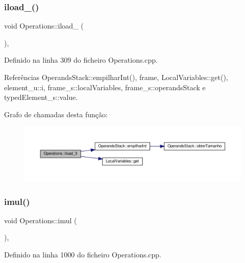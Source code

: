 \subsubsection{\texorpdfstring{iload\+\_()}{iload\_3()}}
{\footnotesize\ttfamily void Operations\+::iload\+\_ (\begin{DoxyParamCaption}{ }\end{DoxyParamCaption})\hspace{0.3cm}{\ttfamily [static]}, {\ttfamily [private]}}



Definido na linha 309 do ficheiro Operations.\+cpp.



Referências Operands\+Stack\+::empilhar\+Int(), frame, Local\+Variables\+::get(), element\+\_\+u\+::i, frame\+\_\+s\+::local\+Variables, frame\+\_\+s\+::operands\+Stack e typed\+Element\+\_\+s\+::value.

Grafo de chamadas desta função\+:
\nopagebreak
\begin{figure}[H]
\begin{center}
\leavevmode
\includegraphics[width=350pt]{classOperations_a3f645534291129289ee71c708dbe633c_cgraph}
\end{center}
\end{figure}
\mbox{\label{classOperations_a01b2ffdd380327b31b03657eb99b8a81}} 
\subsubsection{\texorpdfstring{imul()}{imul()}}
{\footnotesize\ttfamily void Operations\+::imul (\begin{DoxyParamCaption}{ }\end{DoxyParamCaption})\hspace{0.3cm}{\ttfamily [static]}, {\ttfamily [private]}}



Definido na linha 1000 do ficheiro Operations.\+cpp.



